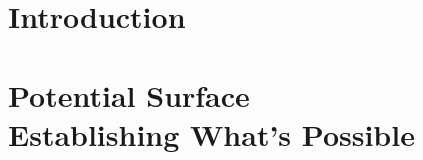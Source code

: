 \documentclass[footheight=20pt, footsepline, headheight=20pt, headsepline]{book}
\begin{document}
\newpage
\tableofcontents
\newpage

\part{Introduction}
\label{part:Introduction}


\part{
    Potential Surface
    \\
    \large{Establishing What's Possible}
}
\label{sec:PotentialSurface}



%
%
%

%

\printbibliography[heading=bibintoc,title={References}]
\end{document}
